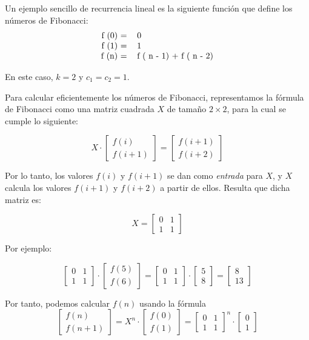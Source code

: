 \begin{itemize}
	Un ejemplo sencillo de recurrencia lineal es la siguiente función que define los números de Fibonacci:
	$$\begin{tabular}{rl}
		f (0) = & 0  \\
		f (1) = & 1 \\
		f (n) =	& f ( n - 1) + f ( n - 2)  \\
	\end{tabular}$$ 

En este caso, $k = 2$ y $c_1 = c_2 = 1$.

Para calcular eficientemente los números de Fibonacci, representamos la fórmula de Fibonacci como una matriz cuadrada $X$ de tamaño $2 \times 2$, para la cual se cumple lo siguiente:

$$X \cdot \begin{bmatrix}
	f(i)  \\
	f(i+1) 
\end{bmatrix} = \begin{bmatrix}
f(i+1)  \\
f(i+2) 
\end{bmatrix}$$

Por lo tanto, los valores $f(i)$ y $f(i+1)$ se dan como \emph{entrada} para $X$, y $X$ calcula los valores $f(i+1)$ y $f(i+2)$ a partir de ellos. Resulta que dicha matriz es:

$$X = \begin{bmatrix}
	0 & 1  \\
	1 & 1 
\end{bmatrix}$$

Por ejemplo:

$$ \begin{bmatrix}
	0 & 1  \\
	1 & 1 
\end{bmatrix} \cdot \begin{bmatrix}
f(5)  \\
f(6) 
\end{bmatrix} =\begin{bmatrix}
0 & 1  \\
1 & 1 
\end{bmatrix} \cdot  \begin{bmatrix}
5  \\
8 
\end{bmatrix} = \begin{bmatrix}
8  \\
13 
\end{bmatrix} $$

Por tanto, podemos calcular $f(n)$ usando la fórmula
$$ \begin{bmatrix}
	f(n)  \\
	f(n+1) 
\end{bmatrix} = X^n \cdot \begin{bmatrix}
f(0)  \\
f(1) 
\end{bmatrix} = \begin{bmatrix}
0 & 1  \\
1 & 1 
\end{bmatrix}^n \cdot  \begin{bmatrix}
0  \\
1 
\end{bmatrix} $$


\end{itemize}
